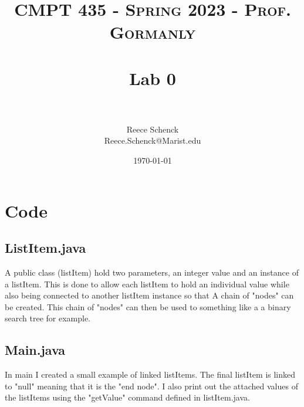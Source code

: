\documentclass[10pt]{article}
\title{	
   \normalfont \normalsize 
   \textsc{CMPT 435 - Spring 2023 - Prof. Gormanly} \\[10pt] %
   \horrule{0.5pt} \\[0.25cm] 	%
   \huge Lab 0  \\     	    %
   \horrule{0.5pt} \\[0.25cm] 	%
}
\author{Reece Schenck \\ \normalsize Reece.Schenck@Marist.edu}
\date{\normalsize\today} 	%
\begin{document}
\maketitle %

\section{Code}

\subsection{ListItem.java}
A public class (listItem) hold two parameters, an integer value and an instance of a listItem. This is done to allow each listItem to hold an individual value while also being connected to another listItem instance so that A chain of "nodes" can be created. This chain of "nodes" can then be used to something like a a binary search tree for example.

\subsection{Main.java}
In main I created a small example of linked listItems. The final listItem is linked to "null" meaning that it is the "end node". I also print out the attached values of the listItems using the "getValue" command defined in listItem.java.



\pagebreak


 
\end{document}
